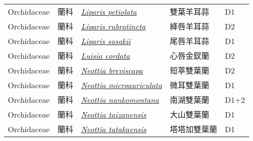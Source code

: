 {\begin{longtable}{L{2.5cm}L{2cm}L{5cm}L{2.5cm}L{3cm}}
    Orchidaceae & 蘭科 & \href{http://www.theplantlist.org/tpl1.1/search?q=Liparis+petiolata}{\textit{Liparis petiolata} } & 雙葉羊耳蒜 & D1    \\
    Orchidaceae & 蘭科 & \href{http://www.theplantlist.org/tpl1.1/search?q=Liparis+rubrotincta}{\textit{Liparis rubrotincta} } & 絳唇羊耳蒜 & D2    \\
    Orchidaceae & 蘭科 & \href{http://www.theplantlist.org/tpl1.1/search?q=Liparis+sasakii}{\textit{Liparis sasakii} } & 尾唇羊耳蒜 & D1    \\
    Orchidaceae & 蘭科 & \href{http://www.theplantlist.org/tpl1.1/search?q=Luisia+cordata}{\textit{Luisia cordata} } & 心唇金釵蘭 & D2    \\
    Orchidaceae & 蘭科 & \href{http://www.theplantlist.org/tpl1.1/search?q=Neottia+breviscapa}{\textit{Neottia breviscapa} } & 短葶雙葉蘭 & D2    \\
    Orchidaceae & 蘭科 & \href{http://www.theplantlist.org/tpl1.1/search?q=Neottia+microauriculata}{\textit{Neottia microauriculata} } & 微耳雙葉蘭 & D1    \\
    Orchidaceae & 蘭科 & \href{http://www.theplantlist.org/tpl1.1/search?q=Neottia+nankomontana}{\textit{Neottia nankomontana} } & 南湖雙葉蘭 & D1+2    \\
    Orchidaceae & 蘭科 & \href{http://www.theplantlist.org/tpl1.1/search?q=Neottia+taizanensis}{\textit{Neottia taizanensis} } & 大山雙葉蘭 & D1    \\
    Orchidaceae & 蘭科 & \href{http://www.theplantlist.org/tpl1.1/search?q=Neottia+tatakaensis}{\textit{Neottia tatakaensis} } & 塔塔加雙葉蘭 & D1    \\

\end{longtable}}
